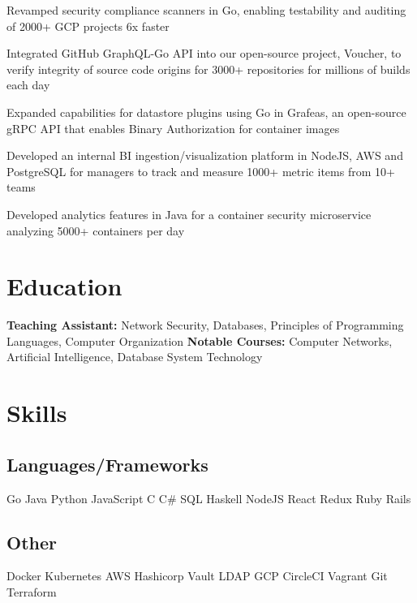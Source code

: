 \documentclass[]{deedy-resume}
\begin{document}
\begin{tightemize}
\item Revamped security compliance scanners in Go, enabling testability and auditing of 2000+ GCP projects 6x faster
\item Integrated GitHub GraphQL-Go API into our open-source project, Voucher, to verify integrity of source code origins for 3000+ repositories for millions of builds each day
\item Expanded capabilities for datastore plugins using Go in Grafeas, an open-source gRPC API that enables Binary Authorization for container images
\end{tightemize}
\sectionsep

\begin{tightemize}
\item Developed an internal BI ingestion/visualization platform in NodeJS, AWS and PostgreSQL for managers to track and measure 1000+ metric items from 10+ teams
\item Developed analytics features in Java for a container security microservice analyzing 5000+ containers per day
\end{tightemize}
\sectionsep

\section{Education}

\textbf{Teaching Assistant:} Network Security, Databases, Principles of Programming Languages, Computer Organization
\newline
\textbf{Notable Courses:} Computer Networks, Artificial Intelligence, Database System Technology
\sectionsep

\section{Skills}
\begin{minipage}[t]{1.0\textwidth}
\subsection{Languages/Frameworks}
Go \textbullet{} Java \textbullet{} Python \textbullet{} JavaScript \textbullet{} C \textbullet{}
C\# \textbullet{} SQL \textbullet{} Haskell \textbullet{}
NodeJS \textbullet{} React \textbullet{} Redux \textbullet{} Ruby \textbullet{} Rails
\sectionsep
\subsection{Other}
Docker \textbullet{} Kubernetes \textbullet{} AWS \textbullet{} Hashicorp Vault \textbullet{} LDAP \textbullet{} GCP
\textbullet{} CircleCI \textbullet{} Vagrant \textbullet{} Git \textbullet{} Terraform
\sectionsep
\end{minipage}
\hfill
\end{document}
